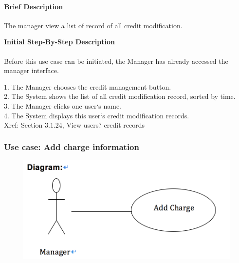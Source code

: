 \documentclass[12pt]{report}
\begin{document}
\paragraph{}
\begin{flushleft}
\textbf{Brief Description }
\paragraph{}
The manager view a list of record of all credit modification. \\

\begin{flushleft}
\textbf{Initial Step-By-Step Description }
\paragraph{}
Before this use case can be initiated, the Manager has already accessed the manager interface.

\begin{flushleft}
1.	The Manager chooses the credit management button.  \\
2.	The System shows the list of all credit modification record, sorted by time. \\
3.	The Manager clicks one user`s name. \\
4.	The System displays this user`s credit modification records. \\
Xref: Section 3.1.24, View users? credit records
\end{flushleft}
\end{flushleft}
\end{flushleft}

\newpage
\subsubsection{Use case:  Add charge information }

\begin{figure}[!htb]
  \includegraphics{211.PNG}
\end{figure}
\end{document}
